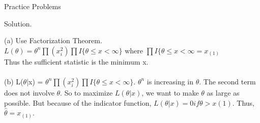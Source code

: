\documentclass[11pt,fleqn]{book} %
\begin{document}
\begin{section}{Practice Problems}
\begin{problem}
		Solution. 

		(a) Use Factorization Theorem.\\ 
		$L(\theta) = \theta^n \prod(x_i^2) \prod I\{\theta \le x < \infty\}$ where $\prod I\{\theta \le x < \infty = x_{(1)}$\\
		Thus the sufficient statistic is the minimum x. \\
		\\
		(b) L($\theta$|x) = $\theta^n \prod(x_i^2) \prod I\{\theta \le x < \infty \}$. $\theta^n$ is increasing in $\theta$. The second term does not involve $\theta$. So to maximize $L(\theta|x)$, we want to make $\theta$ as large as possible. But because of the indicator function, $L(\theta|x) = 0 if \theta > x(1)$. Thus, $\hat{\theta} = x_{(1)}$.


	\end{problem}

\end{section}









\end{document}

